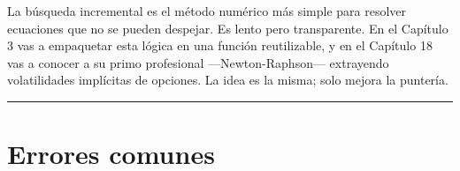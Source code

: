 \documentclass[
  spanish,
  letterpaper,
  DIV=11,
  numbers=noendperiod]{scrreprt}
\begin{document}
\begin{tcolorbox}[enhanced jigsaw, bottomrule=.15mm, colback=white, opacitybacktitle=0.6, arc=.35mm, toprule=.15mm, opacityback=0, breakable, titlerule=0mm, left=2mm, coltitle=black, colbacktitle=quarto-callout-tip-color!10!white, colframe=quarto-callout-tip-color-frame, leftrule=.75mm, toptitle=1mm, bottomtitle=1mm, title=\textcolor{quarto-callout-tip-color}{\faLightbulb}\hspace{0.5em}{Esto que hiciste tiene nombre}, rightrule=.15mm]

La búsqueda incremental es el método numérico más simple para resolver
ecuaciones que no se pueden despejar. Es lento pero transparente. En el
Capítulo 3 vas a empaquetar esta lógica en una función reutilizable, y
en el Capítulo 18 vas a conocer a su primo profesional
---Newton-Raphson--- extrayendo volatilidades implícitas de opciones. La
idea es la misma; solo mejora la puntería.

\end{tcolorbox}

\begin{center}\rule{0.5\linewidth}{0.5pt}\end{center}

\section{Errores comunes}\label{errores-comunes}
\end{document}
